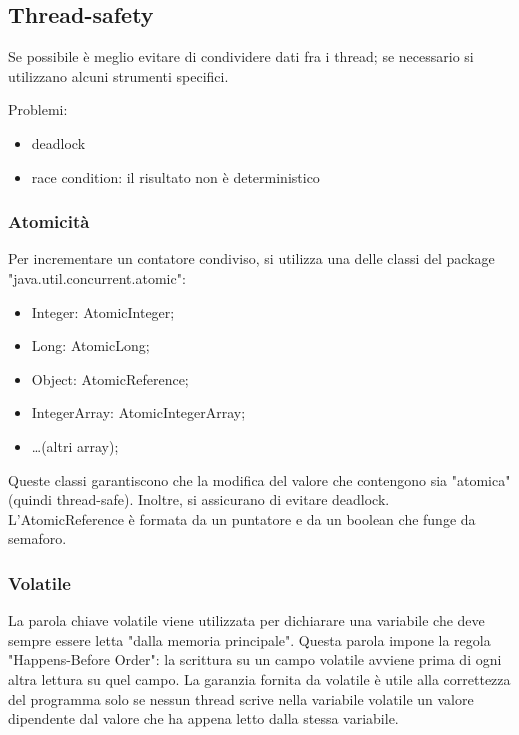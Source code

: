 \documentclass{article}
\begin{document}
\subsection{Thread-safety}

Se possibile è meglio evitare di condividere dati fra i thread; se necessario si
utilizzano alcuni strumenti specifici.

Problemi: 
\begin{itemize}
	\item deadlock

	\item race condition: il risultato non è deterministico
\end{itemize}

\subsubsection{Atomicità}

Per incrementare un contatore condiviso, si utilizza una delle classi del
package "java.util.concurrent.atomic":
\begin{itemize}
	\item Integer: AtomicInteger;

	\item Long: AtomicLong;

	\item Object: AtomicReference;

	\item IntegerArray: AtomicIntegerArray;

	\item \dots (altri array);
\end{itemize}

Queste classi garantiscono che la modifica del valore che contengono sia
"atomica" (quindi thread-safe). Inoltre, si assicurano di evitare deadlock.\\
L'AtomicReference è formata da un puntatore e da un boolean che funge da
semaforo.

\subsubsection{Volatile}

La parola chiave volatile viene utilizzata per dichiarare una variabile che
deve sempre essere letta "dalla memoria principale". Questa parola impone la
regola "Happens-Before Order": la scrittura su un campo volatile avviene prima
di ogni altra lettura su quel campo. La garanzia fornita da volatile è utile
alla correttezza del programma solo se nessun thread scrive nella variabile
volatile un valore dipendente dal valore che ha appena letto dalla stessa
variabile.
\end{document}

